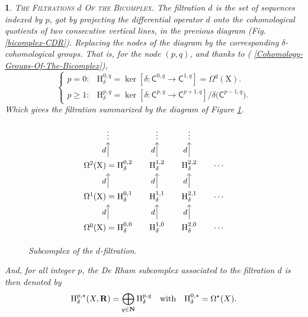 \documentclass[12pt,reqno]{amsart}
\theoremstyle{article}
\newtheorem{article}{}
\def\artlabel[#1]{\textsc{#1}.}
\newcommand{\art}[1]{(\text{\textsection} \ref{#1})}
\def \H{\mathrm H}
\def \X{\mathrm X}
\newcommand{\NN}{{\bf N}}
\newcommand{\RR}{{\bf R}}
\newcommand{\sC}{\mathsf{C}}
\def \H{\mathrm H}
\begin{document}
  \begin{article}\artlabel[The Filtrations $d$ Of the Bicomplex]
    The filtration $d$ is the set of sequences indexed by $p$,
    got by projecting the differential operator $d$ onto the cohomological quotients of two consecutive vertical lines,
    in the previous diagram (Fig. \ref{bicomplex-CDR}).
    Replacing the nodes of the diagram by the corresponding $\delta$-cohomological groups.
    That is,
    for the node $(p,q)$,
    and thanks to \art{Cohomology-Groups-Of-The-Bicomplex},
    $$
    \left\{
    \begin{array}{ll}
      p = 0 :    & \H_\delta^{0,q} = \ker[\delta \colon \sC^{0,q} \to \sC^{1,q}] = \Omega^q(\X). \\[.25cm]
      p \geq 1 : & \H_\delta^{p,q} = \ker[\delta \colon \sC^{p,q} \to \sC^{p+1,q}]/\delta\big(\sC^{p-1,q}\big).
    \end{array}
    \right.
    $$
    Which gives the filtration summarized by the diagram of Figure \ref{d-Subcomplex}.
    
    \begin{figure}[thb]
      $$
      \begin{tikzcd}[column sep=small,every label/.append style = {font = \small}]
        \vdots                                           & \vdots                             &   \vdots                            &         \\
        \Omega^2(\X) = \H_\delta^{0,2} \arrow[u,"d"] & \H_\delta^{1,2} \arrow[u, "d"] & \H_\delta^{2,2} \arrow[u, "d"]  & \cdots  \\
        \Omega^1(\X) = \H_\delta^{0,1} \arrow[u,"d"] & \H_\delta^{1,1} \arrow[u, "d"] & \H_\delta^{2,1} \arrow[u, "d"]  & \cdots  \\
        \Omega^0(\X) = \H_\delta^{0,0} \arrow[u,"d"] & \H_\delta^{1,0} \arrow[u, "d"] & \H_\delta^{2,0} \arrow[u, "d"]  & \cdots
      \end{tikzcd}
      $$
      \vspace{-.5cm}
      \caption{Subcomplex of the $d$-filtration.}
      \label{d-Subcomplex}
    \end{figure}
    And,
    for all integer $p$,
    the De Rham subcomplex associated to the filtration $d$ is then denoted by
    $$
    \H^{p,\star}_\delta(X,\RR)= \bigoplus_{q\in\NN}\H^{p,q}_\delta
    \quad \text{with}\quad \H^{0,\star}_\delta = \Omega^\star(X).
    $$
  \end{article}
  
\end{document}
